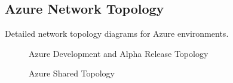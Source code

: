 \begin{appendices}
    \section{Azure Network Topology}
    Detailed network topology diagrams for Azure environments.
    \begin{figure}[H]
        \centering
        \caption{Azure Development and Alpha Release Topology}
        \label{fig:azure-development-topology-appendix}
    \end{figure}
    \begin{figure}[H]
        \centering
        \caption{Azure Shared Topology}
        \label{fig:azure-shared-topology-appendix}
    \end{figure}
    \newpage


\end{appendices}
